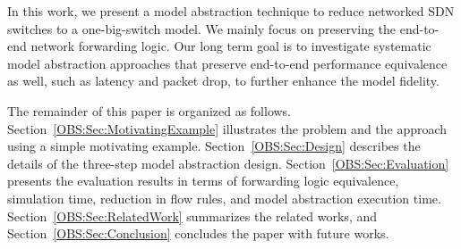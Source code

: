 In this work, we present a model abstraction technique to reduce networked SDN switches to a one-big-switch model.
We mainly focus on preserving the end-to-end network forwarding logic.
Our long term goal is to investigate systematic model abstraction approaches that preserve end-to-end performance equivalence as well,
such as latency and packet drop, to further enhance the model fidelity.

The remainder of this paper is organized as follows.
Section~\ref{OBS:Sec:MotivatingExample} illustrates the problem and the approach using a simple motivating example.
Section~\ref{OBS:Sec:Design} describes the details of the three-step model abstraction design.
Section~\ref{OBS:Sec:Evaluation} presents the evaluation results in terms of forwarding logic equivalence, simulation time,
reduction in flow rules, and model abstraction execution time.
Section~\ref{OBS:Sec:RelatedWork} summarizes the related works, and Section~\ref{OBS:Sec:Conclusion} concludes the paper with future works.
